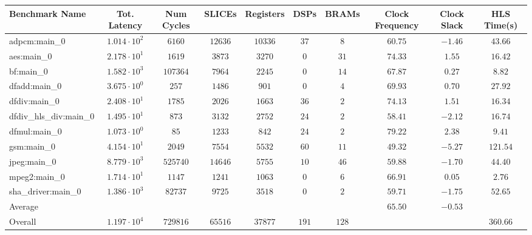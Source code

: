 \begin{tabular}{|l|c|c|c|c|c|c|c|c|c|}
\hline
Benchmark Name          & Tot. Latency           & Num Cycles & SLICEs    & Registers & DSPs    & BRAMs   & Clock Frequency & Clock Slack & HLS Time(s) \\
\hline
adpcm:main\_0           & $ 1.014 \cdot 10^{2} $ & $ 6160   $ & $ 12636 $ & $ 10336 $ & $ 37  $ & $ 8   $ & $ 60.75       $ & $ -1.46   $ & $ 43.66   $ \\
aes:main\_0             & $ 2.178 \cdot 10^{1} $ & $ 1619   $ & $ 3873  $ & $ 3270  $ & $ 0   $ & $ 31  $ & $ 74.33       $ & $ 1.55    $ & $ 16.42   $ \\
bf:main\_0              & $ 1.582 \cdot 10^{3} $ & $ 107364 $ & $ 7964  $ & $ 2245  $ & $ 0   $ & $ 14  $ & $ 67.87       $ & $ 0.27    $ & $ 8.82    $ \\
dfadd:main\_0           & $ 3.675 \cdot 10^{0} $ & $ 257    $ & $ 1486  $ & $ 901   $ & $ 0   $ & $ 4   $ & $ 69.93       $ & $ 0.70    $ & $ 27.92   $ \\
dfdiv:main\_0           & $ 2.408 \cdot 10^{1} $ & $ 1785   $ & $ 2026  $ & $ 1663  $ & $ 36  $ & $ 2   $ & $ 74.13       $ & $ 1.51    $ & $ 16.34   $ \\
dfdiv\_hls\_div:main\_0 & $ 1.495 \cdot 10^{1} $ & $ 873    $ & $ 3132  $ & $ 2752  $ & $ 24  $ & $ 2   $ & $ 58.41       $ & $ -2.12   $ & $ 16.74   $ \\
dfmul:main\_0           & $ 1.073 \cdot 10^{0} $ & $ 85     $ & $ 1233  $ & $ 842   $ & $ 24  $ & $ 2   $ & $ 79.22       $ & $ 2.38    $ & $ 9.41    $ \\
gsm:main\_0             & $ 4.154 \cdot 10^{1} $ & $ 2049   $ & $ 7554  $ & $ 5532  $ & $ 60  $ & $ 11  $ & $ 49.32       $ & $ -5.27   $ & $ 121.54  $ \\
jpeg:main\_0            & $ 8.779 \cdot 10^{3} $ & $ 525740 $ & $ 14646 $ & $ 5755  $ & $ 10  $ & $ 46  $ & $ 59.88       $ & $ -1.70   $ & $ 44.40   $ \\
mpeg2:main\_0           & $ 1.714 \cdot 10^{1} $ & $ 1147   $ & $ 1241  $ & $ 1063  $ & $ 0   $ & $ 6   $ & $ 66.91       $ & $ 0.05    $ & $ 2.76    $ \\
sha\_driver:main\_0     & $ 1.386 \cdot 10^{3} $ & $ 82737  $ & $ 9725  $ & $ 3518  $ & $ 0   $ & $ 2   $ & $ 59.71       $ & $ -1.75   $ & $ 52.65   $ \\
\hline
Average                 & $                    $ & $        $ & $       $ & $       $ & $     $ & $     $ & $ 65.50       $ & $ -0.53   $ & $         $ \\
\hline
Overall                 & $ 1.197 \cdot 10^{4} $ & $ 729816 $ & $ 65516 $ & $ 37877 $ & $ 191 $ & $ 128 $ & $             $ & $         $ & $ 360.66  $ \\
\hline
\end{tabular}
